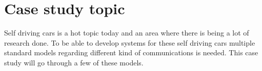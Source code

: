 \section{Case study topic}
Self driving cars is a hot topic today and an area where there is being a lot of research done. To be able to develop systems for these self driving cars multiple standard models regarding different kind of communications is needed. This case study will go through a few of these models.
